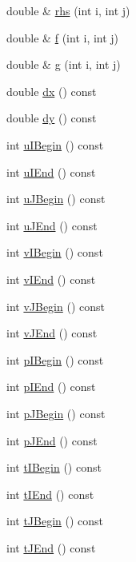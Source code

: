 \begin{DoxyCompactItemize}
double \& \mbox{\hyperlink{classStaggeredGrid_a761ea51f1e8fd1290b3adfe09942b0d3}{rhs}} (int i, int j)
\item 
double \& \mbox{\hyperlink{classStaggeredGrid_adb05c59512dc8993367e4beddba05785}{f}} (int i, int j)
\item 
double \& \mbox{\hyperlink{classStaggeredGrid_aaf849bec40f7fa7c68823038f0877341}{g}} (int i, int j)
\item 
double \mbox{\hyperlink{classStaggeredGrid_aec8490affea703cdd73b1febaed68968}{dx}} () const
\item 
double \mbox{\hyperlink{classStaggeredGrid_abde2da10e0c130fb0f206de64c9b4956}{dy}} () const
\item 
int \mbox{\hyperlink{classStaggeredGrid_a31e2d3a0b6e03685380810a7c2f323e1}{u\+I\+Begin}} () const
\item 
int \mbox{\hyperlink{classStaggeredGrid_a641e473d72e1d02ba3de1c16e9d0d332}{u\+I\+End}} () const
\item 
int \mbox{\hyperlink{classStaggeredGrid_a9b0e97704e1871441a8e713ecaa2cff5}{u\+J\+Begin}} () const
\item 
int \mbox{\hyperlink{classStaggeredGrid_a3393aa91b17054d2d700de308ae25632}{u\+J\+End}} () const
\item 
int \mbox{\hyperlink{classStaggeredGrid_ace7bf8cb1d279131739d5d12de302d09}{v\+I\+Begin}} () const
\item 
int \mbox{\hyperlink{classStaggeredGrid_aa5a44aa088b5a7923fa952af1ecb5778}{v\+I\+End}} () const
\item 
int \mbox{\hyperlink{classStaggeredGrid_a7f8468d672411c0e3a5eeb67788fc826}{v\+J\+Begin}} () const
\item 
int \mbox{\hyperlink{classStaggeredGrid_ab67e8d9d8d76d34fb02d4d644f0b3795}{v\+J\+End}} () const
\item 
int \mbox{\hyperlink{classStaggeredGrid_a9922c955707f2a31a4a27d1d696f002e}{p\+I\+Begin}} () const
\item 
int \mbox{\hyperlink{classStaggeredGrid_a34f16fdf87971fe84ffc3c84722bb2c7}{p\+I\+End}} () const
\item 
int \mbox{\hyperlink{classStaggeredGrid_ae4c9ba16c5635dc1ffaa264fbcc3e034}{p\+J\+Begin}} () const
\item 
int \mbox{\hyperlink{classStaggeredGrid_ad9928ee522eedb7d7fd48ca0b92f2795}{p\+J\+End}} () const
\item 
int \mbox{\hyperlink{classStaggeredGrid_ae68f4a0afe178db8193c3fc6d7e54ad5}{t\+I\+Begin}} () const
\item 
int \mbox{\hyperlink{classStaggeredGrid_a056b7f4154ca679441d69bf692d7a935}{t\+I\+End}} () const
\item 
int \mbox{\hyperlink{classStaggeredGrid_adf3e00c08dcd2e35d91577443e4ead1f}{t\+J\+Begin}} () const
\item 
int \mbox{\hyperlink{classStaggeredGrid_a7e63766ceb3fd216875a8bfa3154c920}{t\+J\+End}} () const
\end{DoxyCompactItemize}

